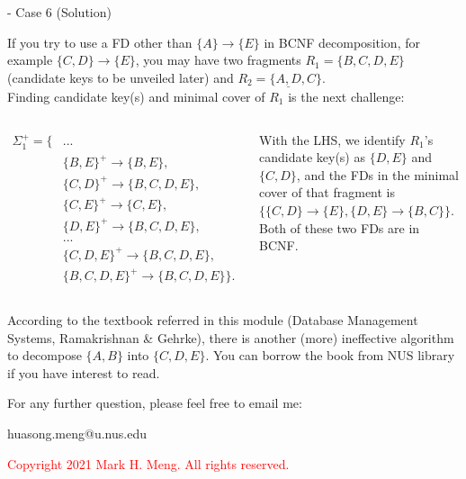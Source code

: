 \begin{frame}[fragile]{ - Case 6 (Solution)}
	
	If you try to use a FD other than $\{A\}  \rightarrow \{E\}$ in BCNF decomposition, for example $\{C,D\}\rightarrow\{E\}$, you may have two fragments $R_1=\{B,C,D,E\}$ (candidate keys to be unveiled later) and $R_2=\{\underline{A,D},C\}$. \\\vspace{2pt}
	Finding candidate key(s) and minimal cover of $R_1$ is the next challenge:\\\vspace{-3pt}
	\begin{columns}
		\begin{scriptsize}\begin{align*} 
				\Sigma_{1}^{+} = \{ & ...\\
				&\{B,E\}^{+} \rightarrow \{B,E\},\\
				&\{C,D\}^{+} \rightarrow \{B,C,D,E\},\\
				&\{C,E\}^{+} \rightarrow \{C,E\},\\
				&\{D,E\}^{+} \rightarrow \{B,C,D,E\},\\
				& ...\\
				&\{C,D,E\}^{+} \rightarrow \{B,C,D,E\},\\
				&\{B,C,D,E\}^{+} \rightarrow \{B,C,D,E\}\}.
		\end{align*}\end{scriptsize} 
		With the LHS, we identify $R_1$'s candidate key(s) as $\{D,E\}$ and $\{C,D\}$, and the FDs in the minimal cover of that fragment is $\{\{C,D\}\rightarrow\{E\}, \{D,E\}\rightarrow\{B,C\}\}$. \\\vspace{2pt}
		Both of these two FDs are in BCNF.
	\end{columns}\vspace{-16pt}
	\begin{block}{}
	{\scriptsize According to the textbook referred in this module (Database Management Systems, Ramakrishnan \& Gehrke), there is another (more) ineffective algorithm to decompose $\{A,B\}$ into $\{C,D,E\}$. You can borrow the book from NUS library if you have interest to read.}
	\end{block}
	
\end{frame}

\begin{frame}{}
	\centering  
	For any further question, please feel free to email me:\vspace{10pt}
	
	huasong.meng@u.nus.edu\\\vspace{3pt}
	
	\begin{tcolorbox}
		\begin{center}
			\textcolor{red}{Copyright 2021 Mark H. Meng. All rights reserved.}
		\end{center}
	\end{tcolorbox}
\end{frame}